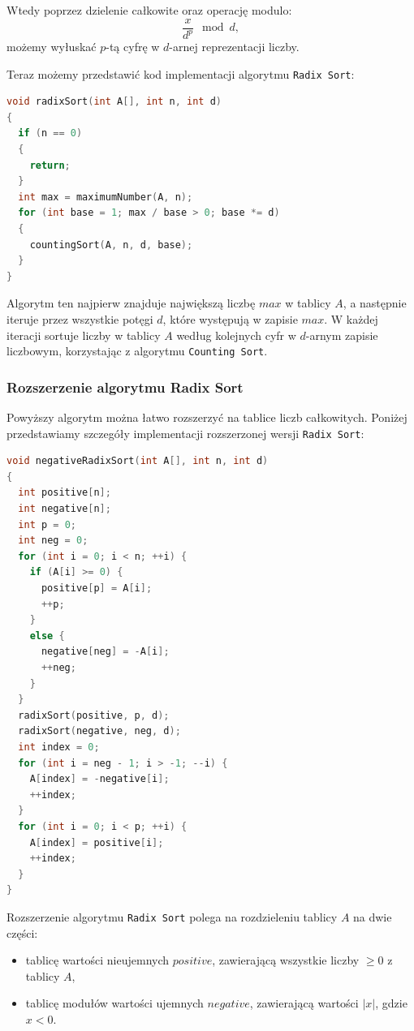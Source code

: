 \documentclass{article}
\begin{document}
Wtedy poprzez dzielenie całkowite oraz operację modulo:
\[
    \frac{x}{d^p} \mod d,
\]
możemy wyłuskać $p$-tą cyfrę w $d$-arnej reprezentacji liczby.

Teraz możemy przedstawić kod implementacji algorytmu \texttt{Radix Sort}:
\newpage
\begin{lstlisting}[style=mystyle, language=C++, caption={Implementacja \texttt{Radix Sort}}, label={lst:radixsort}]
void radixSort(int A[], int n, int d)
{
  if (n == 0)
  {
    return;
  }
  int max = maximumNumber(A, n);
  for (int base = 1; max / base > 0; base *= d)
  {
    countingSort(A, n, d, base);
  }
}
\end{lstlisting}
Algorytm ten najpierw znajduje największą liczbę $max$ w tablicy $A$, a następnie iteruje przez wszystkie potęgi $d$, które występują w zapisie $max$. W każdej iteracji sortuje liczby w tablicy $A$ według kolejnych cyfr w $d$-arnym zapisie liczbowym, korzystając z algorytmu \texttt{Counting Sort}.
\subsubsection{Rozszerzenie algorytmu Radix Sort}
Powyższy algorytm można łatwo rozszerzyć na tablice liczb całkowitych. Poniżej przedstawiamy szczegóły implementacji rozszerzonej wersji \texttt{Radix Sort}:

\begin{lstlisting}[style=mystyle, language=C++, caption={Implementacja rozszerzonej wersji \texttt{Radix Sort}}, label={lst:radixsort2}]
void negativeRadixSort(int A[], int n, int d)
{
  int positive[n];
  int negative[n];
  int p = 0;
  int neg = 0;
  for (int i = 0; i < n; ++i) {
    if (A[i] >= 0) {
      positive[p] = A[i];
      ++p;
    }
    else {
      negative[neg] = -A[i];
      ++neg;
    }
  }
  radixSort(positive, p, d);
  radixSort(negative, neg, d);
  int index = 0;
  for (int i = neg - 1; i > -1; --i) {
    A[index] = -negative[i];
    ++index;
  }
  for (int i = 0; i < p; ++i) {
    A[index] = positive[i];
    ++index;
  }
}
\end{lstlisting}

Rozszerzenie algorytmu \texttt{Radix Sort} polega na rozdzieleniu tablicy $A$ na dwie części:
\begin{itemize}
    \item tablicę wartości nieujemnych $positive$, zawierającą wszystkie liczby $\geq 0$ z tablicy $A$,
    \item tablicę modułów wartości ujemnych $negative$, zawierającą wartości $|x|$, gdzie $x < 0$.
\end{itemize}
\end{document}
